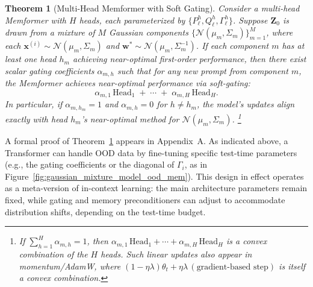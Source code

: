 \documentclass[11pt]{article}
\theoremstyle{plain}
\newtheorem{theorem}{Theorem}[section]
\theoremstyle{definition}
\theoremstyle{remark}
\numberwithin{equation}{section}
\begin{document}
\begin{theorem}[Multi-Head Memformer with Soft Gating]
\label{thm:multihead_moe_refined}
Consider a multi-head Memformer with $H$ heads, each parameterized by 
$\{P_\ell^h, Q_\ell^h, \Gamma_\ell^h\}$. Suppose $\mathbf{Z}_0$ is drawn from a mixture of $M$ Gaussian components 
$\{\mathcal{N}(\mu_m, \Sigma_m)\}_{m=1}^M$, where each $\mathbf{x}^{(i)} \sim \mathcal{N}(\mu_m, \Sigma_m)$ and $\mathbf{w}^*\sim\mathcal{N}(\mu_m,\Sigma_m^{-1})$. If each component $m$ has at least one head $h_m$ achieving near-optimal first-order performance, then there exist scalar \emph{gating coefficients} $\alpha_{m,h}$ such that for any new prompt from component $m$, the Memformer achieves near-optimal performance via \emph{soft-gating}:
\[
\alpha_{m,1}\,\mathrm{Head}_1 \;+\; \cdots \;+\; \alpha_{m,H}\,\mathrm{Head}_H.
\]
In particular, if $\alpha_{m,h_m} = 1$ and $\alpha_{m,h}=0$ for $h \neq h_m$, the model’s updates align exactly with head $h_m$’s near-optimal method for $\mathcal{N}(\mu_m,\Sigma_m)$.
\footnote{If $\sum_{h=1}^H \alpha_{m,h} = 1$, then $\alpha_{m,1}\,\mathrm{Head}_1 + \cdots + \alpha_{m,H}\,\mathrm{Head}_H$ is a convex combination of the $H$ heads. Such linear updates also appear in momentum/AdamW, where $(1 - \eta\lambda)\theta_{t} + \eta\lambda\,(\text{gradient-based step})$ is itself a convex combination.}
\end{theorem}

A formal proof of Theorem~\ref{thm:multihead_moe_refined} appears in Appendix~A. As indicated above, a Transformer can handle OOD data by fine-tuning specific test-time parameters (e.g., the gating coefficients or the diagonal of \(\Gamma_i\), as in Figure~\ref{fig:gaussian_mixture_model_ood_mem}). This design in effect operates as a meta-version of in-context learning: the main architecture parameters remain fixed, while gating and memory preconditioners can adjust to accommodate distribution shifts, depending on the test-time budget.
\end{document}
